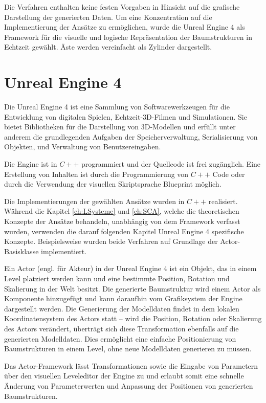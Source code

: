 Die Verfahren enthalten keine festen Vorgaben in Hinsicht auf die grafische Darstellung der generierten Daten. Um eine Konzentration auf die Implementierung der Ansätze zu ermöglichen, wurde die Unreal Engine 4 als Framework für die visuelle und logische Repräsentation der Baumstrukturen in Echtzeit gewählt. Äste werden vereinfacht als Zylinder dargestellt.

\section{Unreal Engine 4}

Die Unreal Engine 4 ist eine Sammlung von Softwarewerkzeugen für die Entwicklung von digitalen Spielen, Echtzeit-3D-Filmen und Simulationen. \cite{WhatIsUE:17} Sie bietet Bibliotheken für die Darstellung von 3D-Modellen und erfüllt unter anderem die grundlegenden Aufgaben der Speicherverwaltung, Serialisierung von Objekten, und Verwaltung von Benutzereingaben. \cite{EngineFeatures:17}

Die Engine ist in $C++$ programmiert und der Quellcode ist frei zugänglich. Eine Erstellung von Inhalten ist durch die Programmierung von $C++$ Code oder durch die Verwendung der visuellen Skriptsprache \glqq Blueprint\grqq{} möglich. \cite{WhatIsUE:17}

Die Implementierungen der gewählten Ansätze wurden in $C++$ realisiert. Während die Kapitel \ref{ch:LSysteme} und \ref{ch:SCA}, welche die theoretischen Konzepte der Ansätze behandeln, unabhängig von dem Framework verfasst wurden, verwenden die darauf folgenden Kapitel Unreal Engine 4 spezifische Konzepte. Beispielsweise wurden beide Verfahren auf Grundlage der Actor-Basisklasse implementiert.

Ein Actor (engl. für Akteur) in der Unreal Engine 4 ist ein Objekt, das in einem Level platziert werden kann und eine bestimmte Position, Rotation und Skalierung in der Welt besitzt. Die generierte Baumstruktur wird einem Actor als Komponente hinzugefügt und kann daraufhin vom Grafiksystem der Engine dargestellt werden. Die Generierung der Modelldaten findet in dem lokalen Koordinatensystem des Actors statt -- wird die Position, Rotation oder Skalierung des Actors verändert, überträgt sich diese Transformation ebenfalls auf die generierten Modelldaten. Dies ermöglicht eine einfache Positionierung von Baumstrukturen in einem Level, ohne neue Modelldaten generieren zu müssen. \cite{UnrealTerminology:17}

Das Actor-Framework lässt Transformationen sowie die Eingabe von Parametern über den visuellen Leveleditor der Engine zu und erlaubt somit eine schnelle Änderung von Parameterwerten und Anpassung der Positionen von generierten Baumstrukturen. \cite{UnrealTerminology:17}

